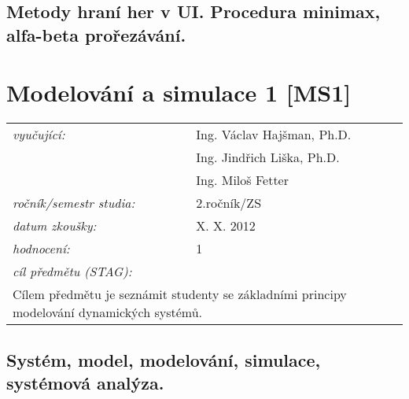 \subsection{Metody hraní her v UI. Procedura minimax, alfa-beta prořezávání.}

\newpage
\section{Modelování a simulace 1 [MS1]}

\begin{table}[H]
\centering
\begin{tabular}{p{4cm} p{12cm}}
\textit{vyučující:}             & Ing. Václav Hajšman, Ph.D. \\
								 & Ing. Jindřich Liška, Ph.D. \\
								 & Ing. Miloš Fetter \\
\textit{ročník/semestr studia:} & 2.ročník/ZS \\
\textit{datum zkoušky:}         & X. X. 2012 \\
\textit{hodnocení:}             & 1 \\
\textit{cíl předmětu (STAG):}   & \\
\multicolumn{2}{p{16cm}}{Cílem předmětu je seznámit studenty se základními principy modelování dynamických systémů.}
\end{tabular}
\end{table}

\subsection{Systém, model, modelování, simulace, systémová analýza.}
